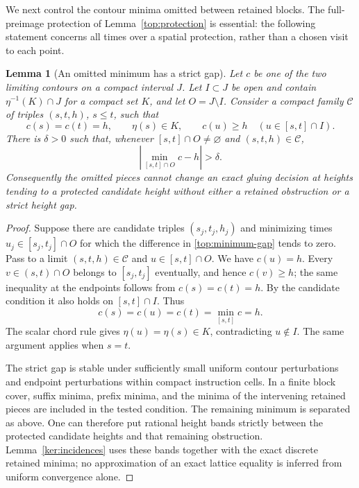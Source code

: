 \documentclass[11pt]{article}
\numberwithin{equation}{section}
\newtheorem{lemma}[theorem]{Lemma}
\theoremstyle{definition}
\theoremstyle{remark}
\newcommand{\1}{\mathbf 1}
\begin{document}
We next control the contour minima omitted between retained blocks.
The full-preimage protection of Lemma~\ref{top:protection} is essential:
the following statement concerns all times over a
spatial protection, rather than a chosen visit to each point.

\begin{lemma}[An omitted minimum has a strict gap]
\label{top:minimum-protection}
Let $c$ be one of the two limiting contours on a compact interval $J$.
Let $I\subset J$ be open and contain $\eta^{-1}(K)\cap J$ for a compact
set $K$, and let $O=J\setminus I$.  Consider a compact family
$\mathcal C$ of triples $(s,t,h)$, $s\le t$, such that
\[
 c(s)=c(t)=h,\qquad \eta(s)\in K,\qquad
 c(u)\ge h\quad (u\in[s,t]\cap I).
\]
There is $\delta>0$ such that, whenever
$[s,t]\cap O\ne\varnothing$ and $(s,t,h)\in\mathcal C$,
\begin{equation}\label{top:minimum-gap}
 \left|\min_{[s,t]\cap O}c-h\right|>\delta.
\end{equation}
Consequently the omitted pieces cannot change an exact gluing decision
at heights tending to a protected candidate height without either a
retained obstruction or a strict height gap.
\end{lemma}

\begin{proof}
Suppose there are candidate triples $(s_j,t_j,h_j)$ and minimizing
times $u_j\in[s_j,t_j]\cap O$ for which the difference in
\eqref{top:minimum-gap} tends to zero.  Pass to a limit
$(s,t,h)\in\mathcal C$ and $u\in[s,t]\cap O$.  We have $c(u)=h$.
Every $v\in(s,t)\cap O$ belongs to $[s_j,t_j]$ eventually, and hence
$c(v)\ge h$; the same inequality at the endpoints follows from
$c(s)=c(t)=h$.  By the candidate condition it also holds on
$[s,t]\cap I$.  Thus
\[
 c(s)=c(u)=c(t)=\min_{[s,t]}c=h.
\]
The scalar chord rule gives $\eta(u)=\eta(s)\in K$, contradicting
$u\notin I$.  The same argument applies when $s=t$.

The strict gap is stable under sufficiently small uniform contour
perturbations and endpoint perturbations within compact instruction
cells.  In a finite block cover, suffix minima, prefix minima, and the
minima of the intervening retained pieces are included in the tested
condition.  The remaining minimum is separated as above.  One can
therefore put rational height bands strictly between the protected
candidate heights and that remaining obstruction.  Lemma~\ref{ker:incidences}
uses these bands together with the exact discrete retained minima; no
approximation of an exact lattice equality is inferred from uniform
convergence alone.
\end{proof}
\end{document}
